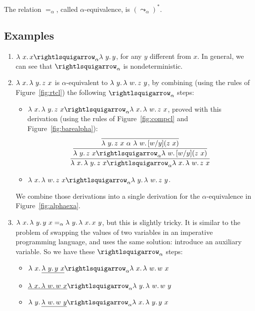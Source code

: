 \begin{definition}
\label{def:alpha}
  The relation $=_\alpha$, called $\alpha$-equivalence, is $(\leadsto_\alpha)^*$.
  \end{definition}

\subsection{Examples}

\begin{enumerate}
\item $\lam{x}{x} \curva_\alpha \lam{y}{y}$, for any $y$ different from $x$.  In general, we can see that $\curva_\alpha$ is nondeterministic.
\item $\lambda\ x.\, \lambda\ y.\, z\ x$ is $\alpha$-equivalent to $\lambda\ y.\, \lambda\ w.\, z\ y$, by combining (using the rules of Figure~\ref{fig:rtcl})
  the following $\curva_\alpha$ steps:
  \begin{itemize}
  \item $\lam{x}{\lam{y}{z\ x}} \curva_\alpha \lam{x}{\lam{w}{z\ x}}$, proved with this derivation (using the rules of Figure~\ref{fig:compcl} and Figure~\ref{fig:barealpha}):
    \[
    \infer{\lam{x}{\lam{y}{z\ x}} \curva_\alpha \lam{x}{\lam{w}{z\ x}}}
          {\infer{\lam{y}{z\ x} \curva_\alpha \lam{w}{[w/y](z\ x)}}{\infer{\lam{y}{z\ x} \ \alpha \ \lam{w}{[w/y](z\ x)} }{\ }}}
          \]
    
    \item $\lam{x}{\lam{w}{z\ x}} \curva_\alpha \lam{y}{\lam{w}{z\ y}}$.
          
  \end{itemize}
  We combine those derivations into a single derivation for the $\alpha$-equivalence in Figure~\ref{fig:alphaexa}.
\item $\lambda\ x.\, \lambda\ y.\, y\ x =_\alpha \lambda\ y.\, \lambda\ x.\, x\ y$, but this is slightly tricky.  It is similar to the problem of swapping the values of two variables in an imperative programming language, and uses the same solution: introduce an auxiliary variable.  So we have these $\curva_\alpha$ steps:
  \begin{itemize}
  \item $\lam{x}{\underline{\lam{y}{y\ x}}} \curva_\alpha \lam{x}{\lam{w}{w\ x}}$
  \item $\underline{\lam{x}{\lam{w}{w\ x}}} \curva_\alpha \lam{y}{\lam{w}{w\ y}}$
  \item $\lam{y}{\underline{\lam{w}{w\ y}}} \curva_\alpha \lam{x}{\lam{y}{y\ x}}$
    \end{itemize}
\end{enumerate}

